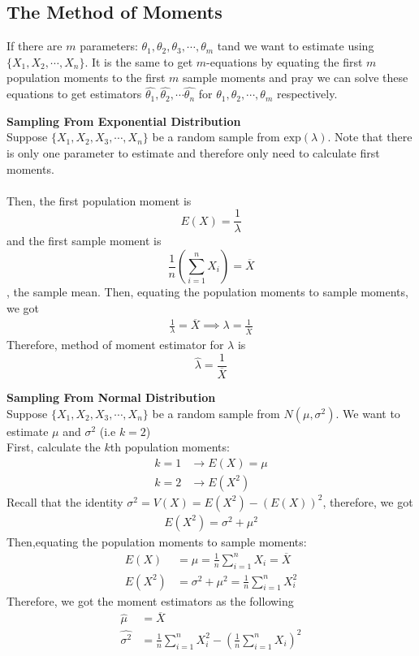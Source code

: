 \subsection[The Method of Moments]{The Method of Moments}
If there are $m$ parameters: $\theta_1,\theta_2,\theta_3,\cdots,\theta_m$ tand we want to estimate using $\{X_1,X_2,\cdots,X_n\}$. It is the same to get $m$-equations by equating the first $m$ population moments to the first $m$ sample moments and pray we can solve these equations to get estimators $\widehat{\theta_1},\widehat{\theta_2},\cdots \widehat{\theta_n}$ for $\theta_1,\theta_2,\cdots,\theta_m$ respectively.\\
\begin{ex}
\textbf{Sampling From Exponential Distribution}\\
Suppose $\{X_1,X_2,X_3,\cdots,X_n\}$ be a random sample from $\text{exp}(\lambda)$. Note that there is only one parameter to estimate and therefore only need to calculate first moments.\\
\hfill\\
Then, the first population moment is $$E(X)=\frac{1}{\lambda}$$ and the first sample moment is $$\frac{1}{n}\left(\sum_{i=1}^nX_i \right)=\overline{X}$$, the sample mean. Then, equating the population moments to sample moments, we got \begin{align*}
\frac{1}{\lambda}=\overline{X} \implies \lambda=\frac{1}{\overline{X}}
\end{align*}
Therefore, method of moment estimator for $\lambda$ is $$\widehat{\lambda}=\frac{1}{\overline{X}}$$
\end{ex}
\begin{ex}
\textbf{Sampling From Normal Distribution}\\
Suppose $\{X_1,X_2,X_3,\cdots,X_n\}$ be a random sample from $N(\mu,\sigma^2)$. We want to estimate $\mu$ and $\sigma^2$ (i.e $k=2$)\\
First, calculate the $k$th population moments:\begin{align*}
k=1&\to E(X)=\mu\\
k=2&\to E(X^2)
\end{align*}
Recall that the identity $\sigma^2=V(X)=E(X^2)-(E(X))^2$, therefore, we got \begin{align*}
E(X^2)=\sigma^2+\mu^2
\end{align*}
Then,equating the population moments to sample moments:\begin{align*}
E(X)&=\mu =\frac{1}{n}\sum_{i=1}^nX_i=\overline{X}\\
E(X^2)&=\sigma^2+\mu^2=\frac{1}{n}\sum_{i=1}^n X_i^2
\end{align*}
Therefore, we got the moment estimators as the following \begin{align*}
\widehat{\mu}&=\overline{X}\\
\widehat{\sigma^2}&=\frac{1}{n}\sum_{i=1}^n X_i^2-\left( \frac{1}{n}\sum_{i=1}^nX_i\right)^2
\end{align*}
\end{ex}
